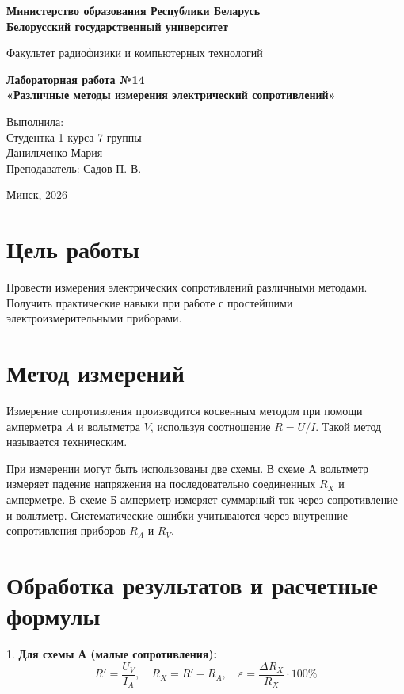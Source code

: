 \documentclass[a4paper,14pt]{extarticle}
\begin{document}
\begin{titlepage}
\begin{center}
\textbf{Министерство образования Республики Беларусь}\\
\textbf{Белорусский государственный университет}

Факультет радиофизики и компьютерных технологий
\vspace{6cm}

\textbf{Лабораторная работа №14}\\
\textbf{«Различные методы измерения электрический сопротивлений»}
\end{center}

\vfill
\begin{flushright}
Выполнила:\\
Студентка 1 курса 7 группы\\
Данильченко Мария\\
Преподаватель: Садов П. В.\\
\end{flushright}

\vfill
\begin{center}
Минск, 2026
\end{center}
\end{titlepage}

\section*{Цель работы}
Провести измерения электрических сопротивлений различными методами. Получить практические навыки при работе с простейшими электроизмерительными приборами.

\section*{Метод измерений}
Измерение сопротивления производится косвенным методом при помощи амперметра $A$ и вольтметра $V$, используя соотношение $R = U/I$. Такой метод называется техническим.

При измерении могут быть использованы две схемы. В схеме А вольтметр измеряет падение напряжения на последовательно соединенных $R_X$ и амперметре. В схеме Б амперметр измеряет суммарный ток через сопротивление и вольтметр. Систематические ошибки учитываются через внутренние сопротивления приборов $R_A$ и $R_V$.

\section*{Обработка результатов и расчетные формулы}
1. \textbf{Для схемы А (малые сопротивления):}
$$R' = \frac{U_V}{I_A}, \quad R_X = R' - R_A, \quad \varepsilon = \frac{\Delta R_X}{R_X} \cdot 100\%$$
\end{document}

